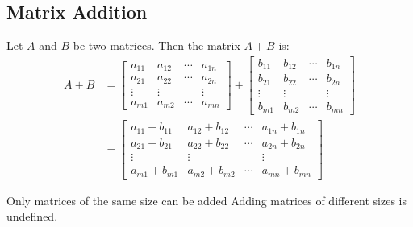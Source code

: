 \documentclass[../notes.tex]{subfiles}
\begin{document}
			\subsection{Matrix Addition}
				Let $A$ and $B$ be two matrices. Then the matrix $A + B$ is:
					\begin{align*}
						A + B &= \begin{bmatrix}
							a_{11} & a_{12} & \cdots & a_{1n}\\
							a_{21} & a_{22} & \cdots & a_{2n}\\
							\vdots & \vdots & & \vdots\\
							a_{m1} & a_{m2} & \cdots & a_{mn}
						\end{bmatrix} + \begin{bmatrix}
							b_{11} & b_{12} & \cdots & b_{1n}\\
							b_{21} & b_{22} & \cdots & b_{2n}\\
							\vdots & \vdots & & \vdots\\
							b_{m1} & b_{m2} & \cdots & b_{mn}
						\end{bmatrix}\\
						&= \begin{bmatrix}
							a_{11} + b_{11} & a_{12} + b_{12} & \cdots & a_{1n} + b_{1n}\\
							a_{21} + b_{21} & a_{22} + b_{22} & \cdots & a_{2n} + b_{2n}\\
							\vdots & \vdots & & \vdots\\
							a_{m1} + b_{m1} & a_{m2} + b_{m2} & \cdots & a_{mn} + b_{mn}
						\end{bmatrix}
					\end{align*}
					\begin{sidenote}{Only matrices of the same size can be added}
						Adding matrices of different sizes is undefined.
					\end{sidenote}
\end{document}
